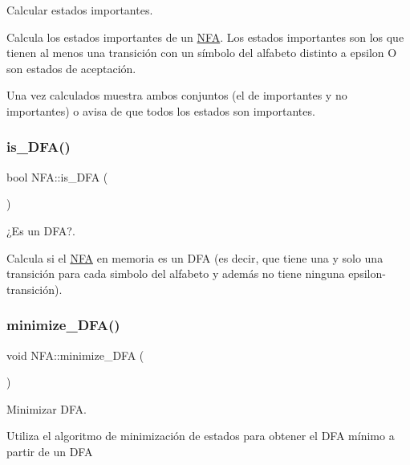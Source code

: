 Calcular estados importantes. 

Calcula los estados importantes de un \mbox{\hyperlink{class_n_f_a}{N\+FA}}. Los estados importantes son los que tienen al menos una transición con un símbolo del alfabeto distinto a epsilon O son estados de aceptación.

Una vez calculados muestra ambos conjuntos (el de importantes y no importantes) o avisa de que todos los estados son importantes. \mbox{\label{class_n_f_a_ab96e6d2ab872971542e2565ceacf4b61}} 
\subsubsection{\texorpdfstring{is\+\_\+\+D\+F\+A()}{is\_DFA()}}
{\footnotesize\ttfamily bool N\+F\+A\+::is\+\_\+\+D\+FA (\begin{DoxyParamCaption}{ }\end{DoxyParamCaption})}



¿\+Es un D\+FA?. 

Calcula si el \mbox{\hyperlink{class_n_f_a}{N\+FA}} en memoria es un D\+FA (es decir, que tiene una y solo una transición para cada simbolo del alfabeto y además no tiene ninguna epsilon-\/transición). \mbox{\label{class_n_f_a_afe68583b823822777693018f69e1b6b0}} 
\subsubsection{\texorpdfstring{minimize\+\_\+\+D\+F\+A()}{minimize\_DFA()}}
{\footnotesize\ttfamily void N\+F\+A\+::minimize\+\_\+\+D\+FA (\begin{DoxyParamCaption}{ }\end{DoxyParamCaption})}



Minimizar D\+FA. 

Utiliza el algoritmo de minimización de estados para obtener el D\+FA mínimo a partir de un D\+FA \mbox{\label{class_n_f_a_a694ab54b829fb1d45ec8bb752a0c31a0}} 
